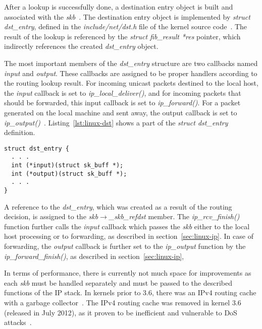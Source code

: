 After a lookup is successfully done, a destination entry
object is built and associated with the {\it{skb}}~\cite{linux-kernel-networking}.
The destination entry object is implemented by {\it{struct dst\_entry}}, defined in the {\it{include/net/dst.h}} file of
the kernel source code~\cite{kernel-source}.
The result of the lookup is referenced by the {\it{struct fib\_result *res}} pointer,
which indirectly references the created {\it{dst\_entry}} object.

The most important members of the {\it{dst\_entry}} structure are two callbacks named {\it{input}} and {\it{output}}.
These callbacks are assigned to be proper handlers according to the routing lookup result.
For incoming unicast packets destined to the local host, the {\it{input}} callback is set to
{\it{ip\_local\_deliver()}}, and for incoming packets that should be forwarded,
this input callback is set to {\it{ip\_forward()}}.
For a packet generated on the local machine and sent away,
the output callback is set to {\it{ip\_output()}}~\cite{linux-kernel-networking}.
Listing~\ref{lst:linux-dst} shows a part of the {\it{struct dst\_entry}} definition.
\bigskip
\begin{lstlisting}[caption={Destination callback members of struct dst\_entry},label={lst:linux-dst}]
struct dst_entry {
  . . .
  int (*input)(struct sk_buff *);
  int (*output)(struct sk_buff *);
  . . .
}
\end{lstlisting}

A reference to the {\it{dst\_entry}}, which was created as a result of the routing decision,
is assigned to the {\it{skb$\rightarrow$\_skb\_refdst}} member.
The {\it{ip\_rcv\_finish()}} function further calls the {\it{input}} callback
which passes the {\it{skb}} either to the local host processing or to forwarding, as described in section~\ref{sec:linux-ip}.
In case of forwarding, the {\it{output}} callback is further set to the {\it{ip\_output}} function by the
{\it{ip\_forward\_finish()}}, as described in section~\ref{sec:linux-ip},

In terms of performance, there is currently not much space for improvements as
each {\it{skb}} must be handled separately and must be passed to the described functions of the IP stack.
In kernels prior to 3.6, there was an IPv4 routing cache with a garbage collector~\cite{linux-kernel-networking}.
The IPv4 routing cache was removed in kernel 3.6 (released in July 2012),
as it proven to be inefficient and vulnerable to DoS attacks~\cite{linux-cache-removing}.

